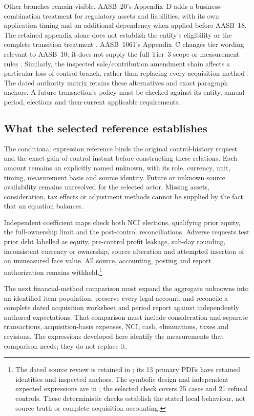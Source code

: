 Other branches remain visible. AASB~20's Appendix~D adds a business-combination treatment for regulatory assets and liabilities, with its own application timing and an additional dependency when applied before AASB~18. The retained appendix alone does not establish the entity's eligibility or the complete transition treatment \citep[Appendix~D, amendments to AASB~3]{aasb20acquisitionappendix}. AASB~1061's Appendix~C changes tier wording relevant to AASB~10; it does not supply the full Tier~3 scope or measurement rules \citep[Appendix~C, amendment to AG1]{aasb1061scopeappendix}. Similarly, the inspected sale/contribution amendment chain affects a particular loss-of-control branch, rather than replacing every acquisition method \citep[paras.~6--8]{aasb2024controltiming}. The dated authority matrix retains these alternatives and exact paragraph anchors. A future transaction's policy must be checked against its entity, annual period, elections and then-current applicable requirements.

\subsection{What the selected reference establishes}

The conditional expression reference binds the original control-history request and the exact gain-of-control instant before constructing these relations. Each amount remains an explicitly named unknown, with its role, currency, unit, timing, measurement basis and source identity. Future or unknown source availability remains unresolved for the selected actor. Missing assets, consideration, tax effects or adjustment methods cannot be supplied by the fact that an equation balances.

Independent coefficient maps check both NCI elections, qualifying prior equity, the full-ownership limit and the post-control reconciliations. Adverse requests test prior debt labelled as equity, pre-control profit leakage, sub-day rounding, inconsistent currency or ownership, source alteration and attempted insertion of an unmeasured face value. All source, accounting, posting and report authorization remains withheld.\footnote{The dated source review is retained in ; its 13 primary PDFs have retained identities and inspected anchors. The symbolic design and independent expected expressions are in ; the selected check covers 25 cases and 21 refusal controls. These deterministic checks establish the stated local behaviour, not source truth or complete acquisition accounting.}

The next financial-method comparison must expand the aggregate unknowns into an identified item population, preserve every legal account, and reconcile a complete dated acquisition worksheet and period report against independently authored expectations. That comparison must include consideration and separate transactions, acquisition-basis expenses, NCI, cash, eliminations, taxes and revisions. The expressions developed here identify the measurements that comparison needs; they do not replace it.
